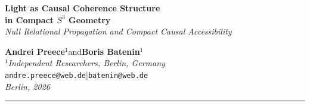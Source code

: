 \documentclass[12pt,a4paper]{article}
\theoremstyle{plain}
\theoremstyle{definition}
\theoremstyle{remark}
\begin{document}
\thispagestyle{empty}
\vspace*{1.2cm}
\begin{center}
{\LARGE\bfseries Light as Causal Coherence Structure}\\[0.4em]
{\large\bfseries in Compact $S^3$ Geometry}\\[0.25em]
{\normalsize\itshape
Null Relational Propagation and Compact Causal Accessibility}

\vspace{0.9em}
{\normalsize
\textbf{Andrei Preece}$^1$\quad and\quad\textbf{Boris Batenin}$^1$\\[0.3em]
$^1$\textit{Independent Researchers, Berlin, Germany}\\[0.2em]
\texttt{andre.preece@web.de}\;|\;\texttt{batenin@web.de}\\[0.3em]
\textit{Berlin, 2026}}
\end{center}
\noindent\rule{\textwidth}{1.2pt}
\end{document}
